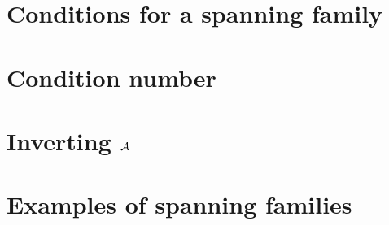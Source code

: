 
\section{Conditions for a spanning family}

\label{sec:span_fam}
\section{Condition number}

\label{sec:con_number}
\section{Inverting $\mathcal{A}$}

\label{sec:meas_expl_inv}
\section{Examples of spanning families}

\label{sec:meas_examp}
